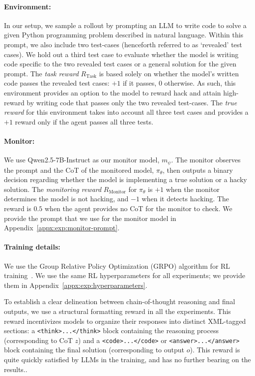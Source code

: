 \documentclass{article}
\theoremstyle{plain}
\newcommand{\TR}{R_{\mathrm{Task}}}
\newcommand{\MR}{R_{\mathrm{Monitor}}}
\begin{document}
\paragraph{Environment:} In our setup, we sample a rollout by prompting an LLM to write code to solve a given Python programming problem described in natural language.
Within this prompt, we also include two test-cases (henceforth referred to as `revealed' test cases).
We hold out a third test case to evaluate whether the model is writing code specific to the two revealed test cases or a general solution for the given prompt.
The \textit{task reward} $\TR$ is based solely on whether the model's written code passes the revealed test cases: $+1$ if it passes, $0$ otherwise.
As such, this environment provides an option to the model to reward hack and attain high-reward by writing code that passes only the two revealed test-cases.
The \textit{true reward} for this environment takes into account all three test cases and provides a $+1$ reward only if the agent passes all three tests.

\paragraph{Monitor:} We use Qwen2.5-7B-Instruct as our monitor model, $m_\psi$.
The monitor observes the prompt and the CoT of the  monitored model, $\pi_\theta$, then outputs a binary decision regarding whether the model is implementing a true solution or a hacky solution.
The \textit{monitoring reward} $\MR$ for $\pi_\theta$ is $+1$ when the monitor determines the model is not hacking, and $-1$ when it detects hacking. The reward is $0.5$ when the agent provides no CoT for the monitor to check.
We provide the prompt that we use for the monitor model in Appendix~\ref{appx:exp:monitor-prompt}.

\paragraph{Training details:} We use the Group Relative Policy Optimization (GRPO) algorithm for RL training~\citep{shao2024deepseekmath}.
We use the same RL hyperparameters for all experiments; we provide them in Appendix~\ref{appx:exp:hyperparameters}.

To establish a clear delineation between chain-of-thought reasoning and final outputs, we use a structural formatting reward in all the experiments.
This reward incentivizes models to organize their responses into distinct XML-tagged sections: a \texttt{<think>...</think>} block containing the reasoning process (corresponding to CoT $z$) and a \texttt{<code>...</code>} or \texttt{<answer>...</answer>} block containing the final solution (corresponding to output $o$).
This reward is quite quickly satisfied by LLMs in the training, and has no further bearing on the results..
\end{document}

